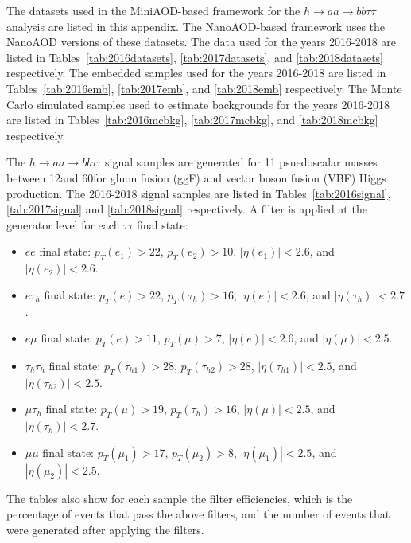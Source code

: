 The datasets used in the MiniAOD-based framework for the $h \rightarrow aa \rightarrow bb\tau\tau$ analysis are listed in this appendix. The NanoAOD-based framework uses the NanoAOD versions of these datasets. The data used for the years 2016-2018 are listed in Tables~\ref{tab:2016datasets}, \ref{tab:2017datasets}, and \ref{tab:2018datasets} respectively. The embedded samples used for the years 2016-2018 are listed in Tables~\ref{tab:2016emb}, \ref{tab:2017emb}, and \ref{tab:2018emb} respectively. The Monte Carlo simulated samples used to estimate backgrounds for the years 2016-2018 are listed in Tables~\ref{tab:2016mcbkg}, \ref{tab:2017mcbkg}, and \ref{tab:2018mcbkg} respectively. 

The $h \rightarrow aa \rightarrow bb\tau\tau$ signal samples are generated for 11 psuedoscalar masses between 12\GeV and 60\GeV for gluon fusion (ggF) and vector boson fusion (VBF) Higgs production. The 2016-2018 signal samples are listed in Tables~\ref{tab:2016signal}, \ref{tab:2017signal} and \ref{tab:2018signal} respectively. A filter is applied at the generator level for each $\tau\tau$ final state:
\begin{itemize}
    \item $ee$ final state: $p_{T}(e_1) > 22$\GeV, $p_{T}(e_{2}) > 10$\GeV, $|\eta(e_{1})| < 2.6$, and $|\eta(e_{2})| < 2.6$.
    \item $e\tau_{h}$ final state: $p_{T}(e) > 22$\GeV, $p_{T}(\tau_{h}) > 16$\GeV, $|\eta(e)| < 2.6$, and $|\eta(\tau_{h})| < 2.7$.
    \item $e\mu$ final state: $p_{T}(e) > 11$\GeV, $p_{T}(\mu) > 7$\GeV, $|\eta(e)| < 2.6$, and $|\eta(\mu)| < 2.5$.
    \item $\tau_{h}\tau_{h}$ final state: $p_{T}(\tau_{h1}) > 28$\GeV, $p_{T}(\tau_{h2}) > 28$\GeV, $|\eta(\tau_{h1})| < 2.5$, and $|\eta(\tau_{h2})| < 2.5$.
    \item $\mu\tau_{h}$ final state: $p_{T}(\mu) > 19$\GeV, $p_{T}(\tau_{h}) > 16$\GeV, $|\eta(\mu)| < 2.5$, and $|\eta(\tau_{h})| < 2.7$.
    \item $\mu\mu$ final state: $p_{T}(\mu_{1}) > 17$\GeV, $p_{T}(\mu_{2}) > 8$\GeV, $|\eta(\mu_{1})| < 2.5$, and $|\eta(\mu_{2})| < 2.5$.
\end{itemize}
The tables also show for each sample the filter efficiencies, which is the percentage of events that pass the above filters, and the number of events that were generated after applying the filters.


